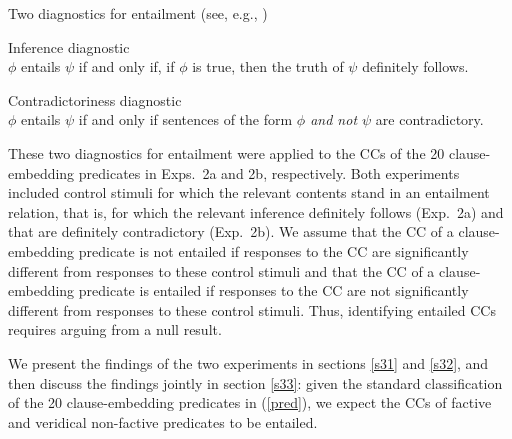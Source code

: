 \documentclass[11pt,fleqn]{article}
\newcommand{\6}{\mbox{$[\hspace*{-.6mm}[$}}
\newcommand{\9}{\mbox{$]\hspace*{-.6mm}]$}}
\begin{document}
\begin{exe}
\ex\label{diag} Two diagnostics for entailment \hfill (see, e.g., \citealt[\S3.1]{ccmg90})
\begin{xlist}
\ex  Inference diagnostic \\ $\phi$ entails $\psi$ if and only if, if $\phi$ is true, then the truth of $\psi$ definitely follows. 

\ex  Contradictoriness diagnostic \\ $\phi$ entails $\psi$ if and only if sentences of the form {\em $\phi$ and not $\psi$} are contradictory. 

\end{xlist}
\end{exe}
These two diagnostics for entailment were applied to the CCs of the 20 clause-embedding predicates in Exps.~2a and 2b, respectively. Both experiments included control stimuli for which the relevant contents stand in an entailment relation, that is, for which the relevant inference definitely follows (Exp.~2a) and that are definitely contradictory (Exp.~2b). We assume that the CC of a clause-embedding predicate is not entailed if responses to the CC are significantly different from responses to these control stimuli and that the CC of a clause-embedding predicate is entailed if responses to the CC are not significantly different from responses to these control stimuli. Thus, identifying entailed CCs  requires arguing from a null result. 

We present the findings of the two experiments in sections \ref{s31} and \ref{s32}, and then discuss the findings jointly in section \ref{s33}: given the standard classification of the 20 clause-embedding predicates in (\ref{pred}), we expect the CCs of factive and veridical non-factive predicates to be entailed.
\end{document}
